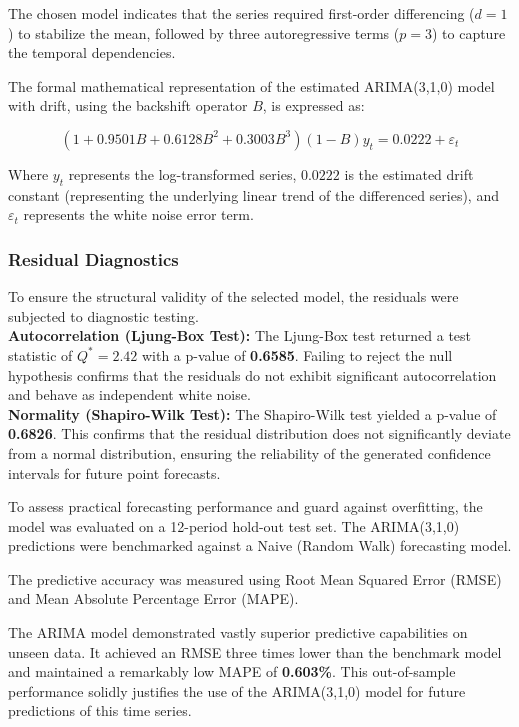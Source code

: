 The chosen model indicates that the series required first-order differencing ($d=1$) to stabilize the mean, followed by three autoregressive terms ($p=3$) to capture the temporal dependencies. 

The formal mathematical representation of the estimated ARIMA(3,1,0) model with drift, using the backshift operator $B$, is expressed as:

$$(1 + 0.9501B + 0.6128B^2 + 0.3003B^3)(1 - B)y_t = 0.0222 + \varepsilon_t$$

Where $y_t$ represents the log-transformed series, $0.0222$ is the estimated drift constant (representing the underlying linear trend of the differenced series), and $\varepsilon_t$ represents the white noise error term.
\subsubsection{Residual Diagnostics}
To ensure the structural validity of the selected model, the residuals were subjected to diagnostic testing. \\
 \textbf{Autocorrelation (Ljung-Box Test):} The Ljung-Box test  returned a test statistic of $Q^* = 2.42$ with a p-value of \textbf{0.6585}. Failing to reject the null hypothesis confirms that the residuals do not exhibit significant autocorrelation and behave as independent white noise. \\
\textbf{Normality (Shapiro-Wilk Test):} The Shapiro-Wilk test  yielded a p-value of \textbf{0.6826}. This confirms that the residual distribution does not significantly deviate from a normal distribution, ensuring the reliability of the generated confidence intervals for future point forecasts.


To assess practical forecasting performance and guard against overfitting, the model was evaluated on a 12-period hold-out test set. The ARIMA(3,1,0) predictions were benchmarked against a Naive (Random Walk) forecasting model. 

The predictive accuracy was measured using Root Mean Squared Error (RMSE) and Mean Absolute Percentage Error (MAPE). 



The ARIMA model demonstrated vastly superior predictive capabilities on unseen data. It achieved an RMSE three times lower than the benchmark model and maintained a remarkably low MAPE of \textbf{0.603\%}. This out-of-sample performance solidly justifies the use of the ARIMA(3,1,0) model for future predictions of this time series.

